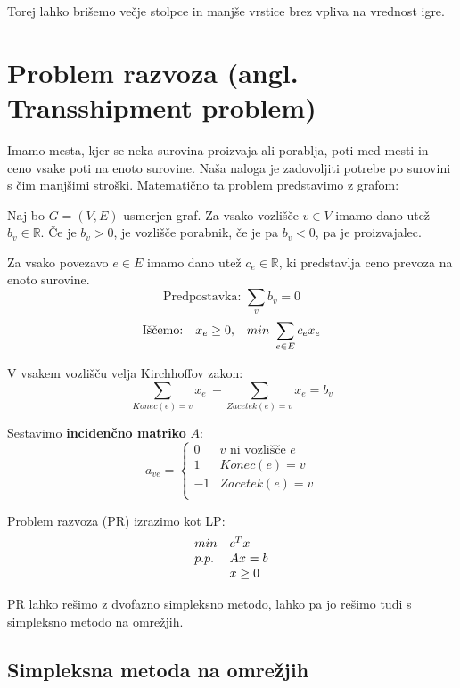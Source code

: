 \documentclass[11pt, a4paper]{article}
\begin{document}
    Torej lahko brišemo večje stolpce in manjše vrstice brez vpliva na vrednost igre.


    \pagebreak
    \section{Problem razvoza (angl. Transshipment problem)}

    Imamo mesta, kjer se neka surovina proizvaja ali porablja, poti med mesti in ceno vsake poti na enoto surovine. Naša naloga je zadovoljiti potrebe po surovini s čim manjšimi stroški. Matematično ta problem predstavimo z grafom:
    \par
    Naj bo \(G = (V,E)\) usmerjen graf. Za vsako vozlišče \(v \in V\) imamo dano utež \(b_v \in \mathbb{R}\). Če je \(b_v > 0\), je vozlišče porabnik, če je pa \(b_v < 0\), pa je proizvajalec.
    \par
    Za vsako povezavo \(e \in E\) imamo dano utež \(c_e \in \mathbb{R}\), ki predstavlja ceno prevoza na enoto surovine.
    \[
        \text{Predpostavka: } \sum_{v} b_v = 0   
    \]
    \[
        \begin{array}{l c r}
            \text{Iščemo:} & x_e \ge 0, & \displaystyle min\ \sum_{e \in E} c_e x_e
        \end{array}
    \]

    V vsakem vozlišču velja Kirchhoffov zakon:
    \[
        \sum_{Konec(e)=v} x_e\ - \sum_{Zacetek(e)=v} x_e = b_v    
    \]

    Sestavimo \textbf{incidenčno matriko} \(A\):
    \[
        a_{ve} = 
        \begin{cases}
            0 & v \text{ ni vozlišče } e \\
            1 & Konec(e)=v \\
            -1 & Zacetek(e)=v \\
        \end{cases}
    \]

    Problem razvoza (PR) izrazimo kot LP:
    \[
        \begin{array}{l l}
            min & c^T x \\
            p.p. & Ax = b \\
            & x \ge 0
        \end{array}
    \]

    PR lahko rešimo z dvofazno simpleksno metodo, lahko pa jo rešimo tudi s simpleksno metodo na omrežjih.

    \subsection{Simpleksna metoda na omrežjih}
\end{document}
